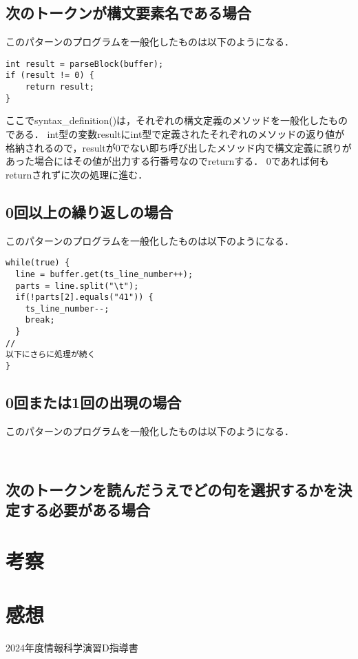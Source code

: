 \documentclass[dvipdfmx]{jarticle}
\begin{document}
\subsection{次のトークンが構文要素名である場合}
このパターンのプログラムを一般化したものは以下のようになる．
\begin{lstlisting}
int result = parseBlock(buffer);
if (result != 0) {
    return result;
}
\end{lstlisting}
ここでsyntax\_definition()は，それぞれの構文定義のメソッドを一般化したものである．
int型の変数resultにint型で定義されたそれぞれのメソッドの返り値が格納されるので，resultが0でない即ち呼び出したメソッド内で構文定義に誤りがあった場合にはその値が出力する行番号なのでreturnする．
0であれば何もreturnされずに次の処理に進む．
\subsection{0回以上の繰り返しの場合}
このパターンのプログラムを一般化したものは以下のようになる．
\begin{lstlisting}
while(true) {
  line = buffer.get(ts_line_number++);
  parts = line.split("\t");
  if(!parts[2].equals("41")) {
    ts_line_number--;
    break;
  }
//
以下にさらに処理が続く
}
\end{lstlisting}
\subsection{0回または1回の出現の場合}
このパターンのプログラムを一般化したものは以下のようになる．
\begin{lstlisting}
  
\end{lstlisting}
\subsection{次のトークンを読んだうえでどの句を選択するかを決定する必要がある場合}
\section{考察}
\section{感想}

\begin{thebibliography}{1}
     2024年度情報科学演習D指導書
\end{thebibliography}
\end{document}
